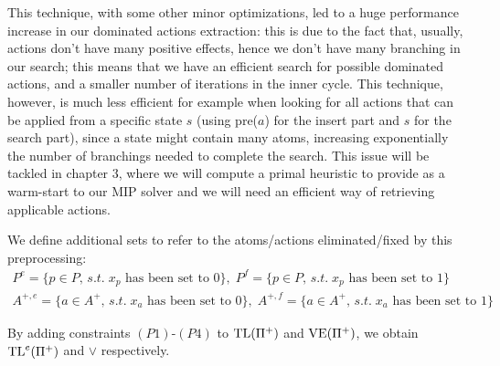 This technique, with some other minor optimizations, led to a huge performance increase in our dominated actions extraction: this is due to the fact that, usually, actions don't have many positive effects, hence we don't have many branching in our search; this means that we have an efficient search for possible dominated actions, and a smaller number of iterations in the inner cycle. This technique, however, is much less efficient for example when looking for all actions that can be applied from a specific state $s$ (using pre($a$) for the insert part and $s$ for the search part), since a state might contain many atoms, increasing exponentially the number of branchings needed to complete the search. This issue will be tackled in chapter $3$, where we will compute a primal heuristic to provide as a warm-start to our MIP solver and we will need an efficient way of retrieving applicable actions.

We define additional sets to refer to the atoms/actions eliminated/fixed by this preprocessing: 
\begin{gather*}
    P^e=\{p\in P,\,s.t.\;x_p\mbox{ has been set to }0\},\;P^f=\{p\in P,\,s.t.\;x_p\mbox{ has been set to }1\}\\
    A^{+,e}=\{a\in A^+,\,s.t.\;x_a\mbox{ has been set to }0\},\;A^{+,f}=\{a\in A^+,\,s.t.\;x_a\mbox{ has been set to }1\}
\end{gather*}

By adding constraints $(P1)$-$(P4)$ to $\mbox{TL}(\Pi^+)$ and $\mbox{VE}(\Pi^+)$, we obtain $\mbox{TL}^e(\Pi^+)$ and $\vee$ respectively.